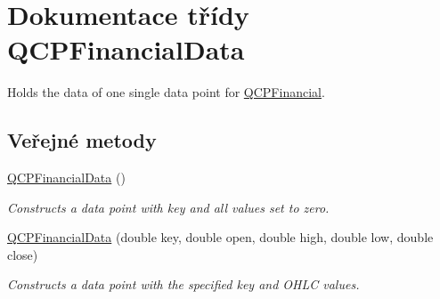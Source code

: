 \hypertarget{classQCPFinancialData}{}\section{Dokumentace třídy Q\+C\+P\+Financial\+Data}
\label{classQCPFinancialData}


Holds the data of one single data point for \hyperlink{classQCPFinancial}{Q\+C\+P\+Financial}.  


\subsection*{Veřejné metody}
\begin{DoxyCompactItemize}
\item 
\hypertarget{classQCPFinancialData_a1ca53b3a9ae4e9658a4fd1ca57d76ba4}{}\hyperlink{classQCPFinancialData_a1ca53b3a9ae4e9658a4fd1ca57d76ba4}{Q\+C\+P\+Financial\+Data} ()\label{classQCPFinancialData_a1ca53b3a9ae4e9658a4fd1ca57d76ba4}

\begin{DoxyCompactList}\small\item\em Constructs a data point with key and all values set to zero. \end{DoxyCompactList}\item 
\hypertarget{classQCPFinancialData_a069b72c514dfd4fc8e1d5df811e54ca4}{}\hyperlink{classQCPFinancialData_a069b72c514dfd4fc8e1d5df811e54ca4}{Q\+C\+P\+Financial\+Data} (double key, double open, double high, double low, double close)\label{classQCPFinancialData_a069b72c514dfd4fc8e1d5df811e54ca4}

\begin{DoxyCompactList}\small\item\em Constructs a data point with the specified {\itshape key} and O\+H\+L\+C values. \end{DoxyCompactList}\end{DoxyCompactItemize}
